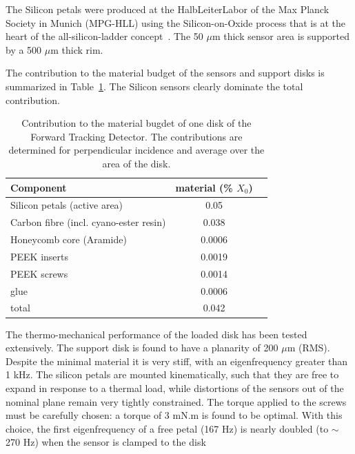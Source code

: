 The Silicon petals were produced at the HalbLeiterLabor of the Max Planck Society in 
Munich (MPG-HLL) using the Silicon-on-Oxide process that is at the heart of the
all-silicon-ladder concept~\cite{Andricek:2004cj}. The 50 $\mu \mathrm{m}$ thick sensor area is supported by a 500 $\mu \mathrm{m}$ thick rim.

The contribution to the material budget of the sensors and support disks is 
summarized in Table~\ref{tab:ftd_disk_material_budget}. The Silicon sensors clearly
dominate the total contribution.

\begin{table}[]
    \centering
    \begin{tabular}{l|c|c}
    Component                      & material (\% $X_0$) \\ \hline
    Silicon petals (active area)  &         0.05 \\
    Carbon fibre (incl. cyano-ester resin)     &   0.038 \\
    Honeycomb core (Aramide)      &   0.0006 \\
    PEEK inserts                  &   0.0019 \\
    PEEK screws                   &   0.0014 \\
    glue                          &   0.0006  \\ \hline
    total                         &     0.042      \\ \hline
    \end{tabular}
    \caption{Contribution to the material bugdet of one disk of the Forward Tracking Detector. The contributions are determined for perpendicular incidence and average over the area
    of the disk.}
    \label{tab:ftd_disk_material_budget}
\end{table}

The thermo-mechanical performance of the loaded disk has been tested extensively. The 
support disk is found to have a planarity of 200 $\mu \mathrm{m}$ (RMS). Despite the 
minimal material it is very stiff, with an eigenfrequency greater than 1 kHz. The
silicon petals are mounted kinematically, such that they are free to expand in response
to a thermal load, while distortions of the sensors out of the nominal plane remain
very tightly constrained. The torque applied to the screws must be carefully 
chosen: a torque of 3 mN.m is found to be optimal. 
With this choice, the first eigenfrequency of a free petal (167 Hz) is nearly
doubled (to $\sim$ 270 Hz) when the sensor is clamped to the disk 

